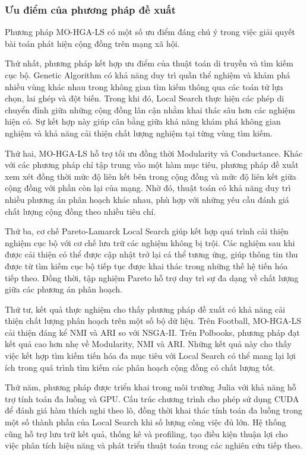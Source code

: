 \documentclass[14pt,a4paper]{extarticle}
\begin{document}
\subsubsection{Ưu điểm của phương pháp đề xuất}

Phương pháp MO-HGA-LS có một số ưu điểm đáng chú ý trong việc giải quyết bài toán phát hiện cộng đồng trên mạng xã hội.

Thứ nhất, phương pháp kết hợp ưu điểm của thuật toán di truyền và tìm kiếm cục bộ. Genetic Algorithm có khả năng duy trì quần thể nghiệm và khám phá nhiều vùng khác nhau trong không gian tìm kiếm thông qua các toán tử lựa chọn, lai ghép và đột biến. Trong khi đó, Local Search thực hiện các phép di chuyển đỉnh giữa những cộng đồng lân cận nhằm khai thác sâu hơn các nghiệm hiện có. Sự kết hợp này giúp cân bằng giữa khả năng khám phá không gian nghiệm và khả năng cải thiện chất lượng nghiệm tại từng vùng tìm kiếm.

Thứ hai, MO-HGA-LS hỗ trợ tối ưu đồng thời Modularity và Conductance. Khác với các phương pháp chỉ tập trung vào một hàm mục tiêu, phương pháp đề xuất xem xét đồng thời mức độ liên kết bên trong cộng đồng và mức độ liên kết giữa cộng đồng với phần còn lại của mạng. Nhờ đó, thuật toán có khả năng duy trì nhiều phương án phân hoạch khác nhau, phù hợp với những yêu cầu đánh giá chất lượng cộng đồng theo nhiều tiêu chí.

Thứ ba, cơ chế Pareto-Lamarck Local Search giúp kết hợp quá trình cải thiện nghiệm cục bộ với cơ chế lưu trữ các nghiệm không bị trội. Các nghiệm sau khi được cải thiện có thể được cập nhật trở lại cá thể tương ứng, giúp thông tin thu được từ tìm kiếm cục bộ tiếp tục được khai thác trong những thế hệ tiến hóa tiếp theo. Đồng thời, tập nghiệm Pareto hỗ trợ duy trì sự đa dạng về chất lượng giữa các phương án phân hoạch.

Thứ tư, kết quả thực nghiệm cho thấy phương pháp đề xuất có khả năng cải thiện chất lượng phân hoạch trên một số bộ dữ liệu. Trên Football, MO-HGA-LS cải thiện đáng kể NMI và ARI so với NSGA-II. Trên Polbooks, phương pháp đạt kết quả cao hơn nhẹ về Modularity, NMI và ARI. Những kết quả này cho thấy việc kết hợp tìm kiếm tiến hóa đa mục tiêu với Local Search có thể mang lại lợi ích trong quá trình tìm kiếm các phân hoạch cộng đồng có chất lượng tốt.

Thứ năm, phương pháp được triển khai trong môi trường Julia với khả năng hỗ trợ tính toán đa luồng và GPU. Cấu trúc chương trình cho phép sử dụng CUDA để đánh giá hàm thích nghi theo lô, đồng thời khai thác tính toán đa luồng trong một số thành phần của Local Search khi số lượng công việc đủ lớn. Hệ thống cũng hỗ trợ lưu trữ kết quả, thống kê và profiling, tạo điều kiện thuận lợi cho việc phân tích hiệu năng và phát triển thuật toán trong các nghiên cứu tiếp theo.
\end{document}
